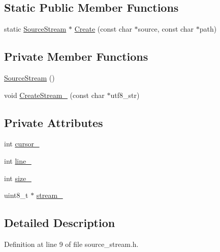 \subsection*{Static Public Member Functions}
\begin{DoxyCompactItemize}
\item 
static \hyperlink{classmocha_1_1_source_stream}{SourceStream} $\ast$ \hyperlink{classmocha_1_1_source_stream_ab8587c6c07193066d2216424e4eff00a}{Create} (const char $\ast$source, const char $\ast$path)
\end{DoxyCompactItemize}
\subsection*{Private Member Functions}
\begin{DoxyCompactItemize}
\item 
\hyperlink{classmocha_1_1_source_stream_af6159c1fd9977a363520f466ce58c503}{SourceStream} ()
\item 
void \hyperlink{classmocha_1_1_source_stream_ac79d89b112d1d9fc2fba5f11b9e07e92}{CreateStream\_\-} (const char $\ast$utf8\_\-str)
\end{DoxyCompactItemize}
\subsection*{Private Attributes}
\begin{DoxyCompactItemize}
\item 
int \hyperlink{classmocha_1_1_source_stream_a1f8d569a431ac46ab8c151022f24a9b1}{cursor\_\-}
\item 
int \hyperlink{classmocha_1_1_source_stream_ae2b4ac025bc7fd6afd68b9a6f373609d}{line\_\-}
\item 
int \hyperlink{classmocha_1_1_source_stream_a22cc46cbc79457e30b3bdd7f11fb1130}{size\_\-}
\item 
uint8\_\-t $\ast$ \hyperlink{classmocha_1_1_source_stream_aedced96615e1c357371f0f174cb95d13}{stream\_\-}
\end{DoxyCompactItemize}


\subsection{Detailed Description}


Definition at line 9 of file source\_\-stream.h.



